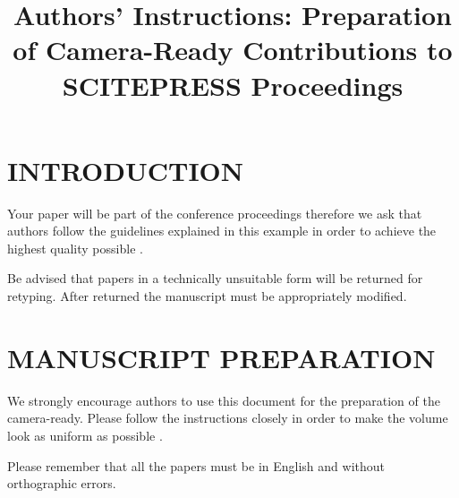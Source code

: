 \documentclass[a4paper,twoside]{article}
\begin{document}
\title{Authors' Instructions: Preparation of Camera-Ready Contributions to SCITEPRESS Proceedings}

\author{
}



\onecolumn \maketitle \normalsize \setcounter{footnote}{0} \vfill

\section{\uppercase{Introduction}}
\label{sec:introduction}

Your paper will be part of the conference proceedings therefore we ask that authors follow the guidelines explained in this example in order to achieve the highest quality possible \cite{Smith98}.

Be advised that papers in a technically unsuitable form will be returned for retyping. After returned the manuscript must be appropriately modified.

\section{\uppercase{Manuscript Preparation}}

We strongly encourage authors to use this document for the preparation of the camera-ready. Please follow the instructions closely in order to make the volume look as uniform as possible \cite{Moore99}.

Please remember that all the papers must be in English and without orthographic errors.
\end{document}
